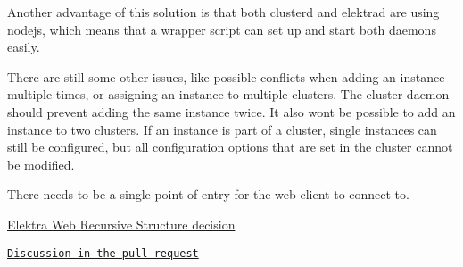 Another advantage of this solution is that both clusterd and elektrad are using nodejs, which means that a wrapper script can set up and start both daemons easily.

There are still some other issues, like possible conflicts when adding an instance multiple times, or assigning an instance to multiple clusters. The cluster daemon should prevent adding the same instance twice. It also won\textquotesingle{}t be possible to add an instance to two clusters. If an instance is part of a cluster, single instances can still be configured, but all configuration options that are set in the cluster cannot be modified.


\begin{DoxyItemize}
\item There needs to be a single point of entry for the web client to connect to.
\end{DoxyItemize}


\begin{DoxyItemize}
\item \hyperlink{doc_decisions_elektra_web_recursive_md}{Elektra Web Recursive Structure decision}
\end{DoxyItemize}


\begin{DoxyItemize}
\item \href{https://github.com/ElektraInitiative/libelektra/pull/1173}{\tt Discussion in the pull request} 
\end{DoxyItemize}